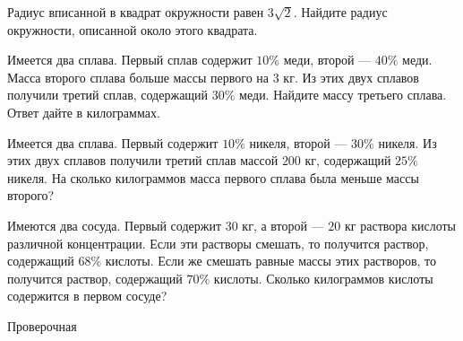 \begin{class}[number=7]
\begin{listofex}
		\item Радиус вписанной в квадрат окружности равен \(3 \sqrt{2}\). Найдите радиус окружности, описанной около этого квадрата.
		\item Имеется два сплава. Первый сплав содержит \(10\%\) меди, второй --- \(40\%\) меди. Масса второго сплава больше массы первого на \(3\) кг. Из этих двух сплавов получили третий сплав, содержащий \(30\%\) меди. Найдите массу третьего сплава. Ответ дайте в килограммах.
		\item Имеется два сплава. Первый содержит \(10\%\) никеля, второй --- \(30\%\) никеля. Из этих двух сплавов получили третий сплав массой \(200\) кг, содержащий \(25\%\) никеля. На сколько килограммов масса первого сплава была меньше массы второго?
		\item Имеются два сосуда. Первый содержит \(30\) кг, а второй --- \(20\) кг раствора кислоты различной концентрации. Если эти растворы смешать, то получится раствор, содержащий \(68\%\) кислоты. Если же смешать равные массы этих растворов, то получится раствор, содержащий \(70\%\) кислоты. Сколько килограммов кислоты содержится в первом сосуде?
		
	\end{listofex}
\end{class}

\begin{exam}
	\begin{listofex}
		\item Проверочная
	\end{listofex}
\end{exam}

%	

